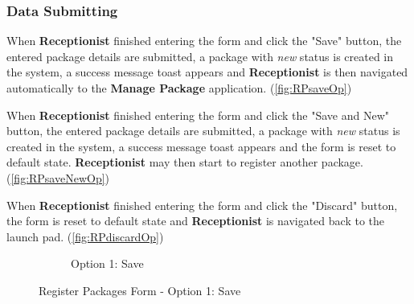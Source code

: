 \subsubsection{Data Submitting}

When \textbf{Receptionist} finished entering the form and click the "Save" button, the entered package details are submitted, a package with \textit{new} status is created in the system, a success message toast appears and \textbf{Receptionist} is then navigated automatically to the \textbf{Manage Package} application. (\autoref{fig:RPsaveOp})

When \textbf{Receptionist} finished entering the form and click the "Save and New" button, the entered package details are submitted, a package with \textit{new} status is created in the system, a success message toast appears and the form is reset to default state. \textbf{Receptionist} may then start to register another package. (\autoref{fig:RPsaveNewOp})

When \textbf{Receptionist} finished entering the form and click the "Discard" button, the form is reset to default state and \textbf{Receptionist} is navigated back to the launch pad. (\autoref{fig:RPdiscardOp})

\begin{figure}[H]
	\centering
    \begin{subfigure}{1\linewidth}
        \centering
        \vspace{5pt}
        \caption{Option 1: Save}
    \end{subfigure}%
    \caption{Register Packages Form - Option 1: Save}
    \label{fig:RPsaveOp}
\end{figure}

